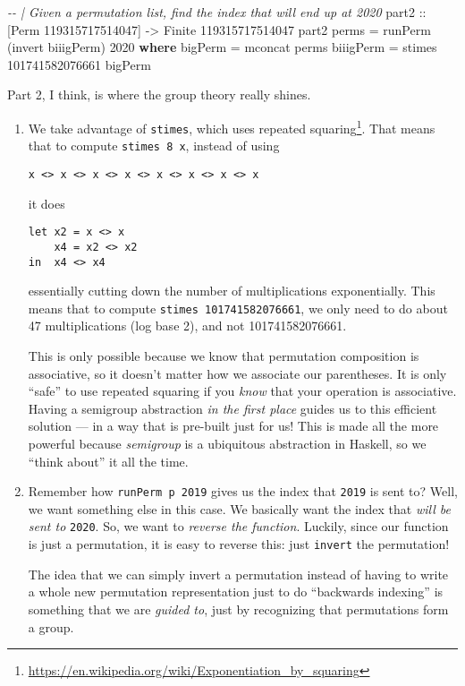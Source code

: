 \documentclass[]{article}
\newenvironment{Shaded}{}{}
\newcommand{\CommentTok}[1]{\textcolor[rgb]{0.38,0.63,0.69}{\textit{#1}}}
\newcommand{\DataTypeTok}[1]{\textcolor[rgb]{0.56,0.13,0.00}{#1}}
\newcommand{\DecValTok}[1]{\textcolor[rgb]{0.25,0.63,0.44}{#1}}
\newcommand{\FunctionTok}[1]{\textcolor[rgb]{0.02,0.16,0.49}{#1}}
\newcommand{\KeywordTok}[1]{\textcolor[rgb]{0.00,0.44,0.13}{\textbf{#1}}}
\newcommand{\NormalTok}[1]{#1}
\newcommand{\OtherTok}[1]{\textcolor[rgb]{0.00,0.44,0.13}{#1}}
\renewcommand{\href}[2]{#2\footnote{\url{#1}}}
\begin{document}
\begin{Shaded}
\begin{Highlighting}[]
\CommentTok{{-}{-} | Given a permutation list, find the index that will end up at 2020}
\OtherTok{part2 ::}\NormalTok{ [}\DataTypeTok{Perm} \DecValTok{119315717514047}\NormalTok{] }\OtherTok{{-}>} \DataTypeTok{Finite} \DecValTok{119315717514047}
\NormalTok{part2 perms }\OtherTok{=}\NormalTok{ runPerm (invert biiigPerm) }\DecValTok{2020}
  \KeywordTok{where}
\NormalTok{    bigPerm   }\OtherTok{=} \FunctionTok{mconcat}\NormalTok{ perms}
\NormalTok{    biiigPerm }\OtherTok{=}\NormalTok{ stimes }\DecValTok{101741582076661}\NormalTok{ bigPerm}
\end{Highlighting}
\end{Shaded}

Part 2, I think, is where the group theory really shines.

\begin{enumerate}
\def\labelenumi{\arabic{enumi}.}
\item
  We take advantage of \texttt{stimes}, which uses
  \href{https://en.wikipedia.org/wiki/Exponentiation_by_squaring}{repeated
  squaring}. That means that to compute \texttt{stimes\ 8\ x}, instead of using

\begin{verbatim}
x <> x <> x <> x <> x <> x <> x <> x
\end{verbatim}

  it does

\begin{verbatim}
let x2 = x <> x
    x4 = x2 <> x2
in  x4 <> x4
\end{verbatim}

  essentially cutting down the number of multiplications exponentially. This
  means that to compute \texttt{stimes\ 101741582076661}, we only need to do
  about 47 multiplications (log base 2), and not 101741582076661.

  This is only possible because we know that permutation composition is
  associative, so it doesn't matter how we associate our parentheses. It is only
  ``safe'' to use repeated squaring if you \emph{know} that your operation is
  associative. Having a semigroup abstraction \emph{in the first place} guides
  us to this efficient solution --- in a way that is pre-built just for us! This
  is made all the more powerful because \emph{semigroup} is a ubiquitous
  abstraction in Haskell, so we ``think about'' it all the time.
\item
  Remember how \texttt{runPerm\ p\ 2019} gives us the index that \texttt{2019}
  is sent to? Well, we want something else in this case. We basically want the
  index that \emph{will be sent to} \texttt{2020}. So, we want to \emph{reverse
  the function}. Luckily, since our function is just a permutation, it is easy
  to reverse this: just \texttt{invert} the permutation!

  The idea that we can simply invert a permutation instead of having to write a
  whole new permutation representation just to do ``backwards indexing'' is
  something that we are \emph{guided to}, just by recognizing that permutations
  form a group.
\end{enumerate}
\end{document}
